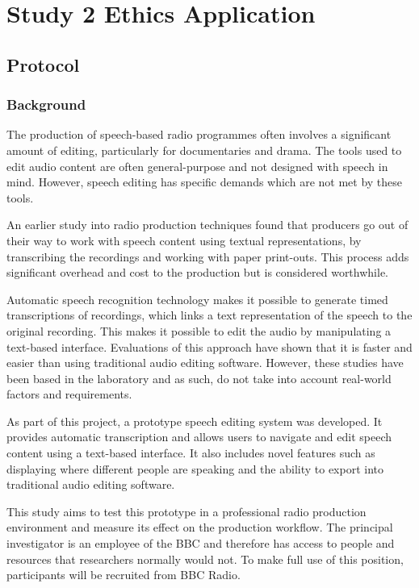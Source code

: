 \chapter{Study 2 Ethics Application}

\section{Protocol}
\subsection{Background}
The production of speech-based radio programmes often involves a significant
amount of editing, particularly for documentaries and drama. The tools used to
edit audio content are often general-purpose and not designed with speech in
mind. However, speech editing has specific demands which are not met by these
tools.

An earlier study into radio production techniques \citep{Baume2015} found that
producers go out of their way to work with speech content using textual
representations, by transcribing the recordings and working with paper
print-outs. This process adds significant overhead and cost to the production
but is considered worthwhile.

Automatic speech recognition technology makes it possible to generate timed
transcriptions of recordings, which links a text representation of the speech
to the original recording. This makes it possible to edit the audio by
manipulating a text-based interface. Evaluations of this approach
\citep{Whittaker2004, Rubin2013} have shown that it is faster and easier than
using traditional audio editing software. However, these studies have been
based in the laboratory and as such, do not take into account real-world
factors and requirements.

As part of this project, a prototype speech editing system was developed. It
provides automatic transcription and allows users to navigate and edit speech
content using a text-based interface. It also includes novel features such as
displaying where different people are speaking and the ability to export into
traditional audio editing software.

This study aims to test this prototype in a professional radio production
environment and measure its effect on the production workflow. The principal
investigator is an employee of the BBC and therefore has access to people and
resources that researchers normally would not. To make full use of this
position, participants will be recruited from BBC Radio.

